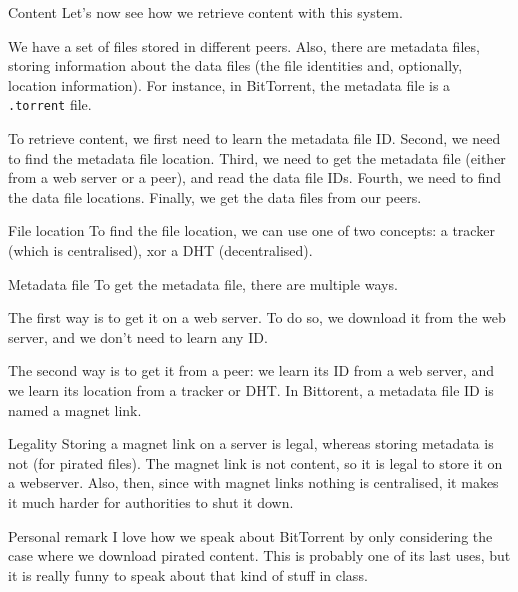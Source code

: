 \documentclass[a4paper]{article}
\begin{document}
\begin{parag}{Content}
    Let's now see how we retrieve content with this system.

    We have a set of files stored in different peers. Also, there are metadata files, storing information about the data files (the file identities and, optionally, location information). For instance, in BitTorrent, the metadata file is a \texttt{.torrent} file.

    To retrieve content, we first need to learn the metadata file ID. Second, we need to find the metadata file location. Third, we need to get the metadata file (either from a web server or a peer), and read the data file IDs. Fourth, we need to find the data file locations. Finally, we get the data files from our peers.
\end{parag}

\begin{parag}{File location}
    To find the file location, we can use one of two concepts: a tracker (which is centralised), xor a DHT (decentralised).
\end{parag}

\begin{parag}{Metadata file}
    To get the metadata file, there are multiple ways.

    The first way is to get it on a web server. To do so, we download it from the web server, and we don't need to learn any ID.

    The second way is to get it from a peer: we learn its ID from a web server, and we learn its location from a tracker or DHT. In Bittorent, a metadata file ID is named a magnet link.

    \begin{subparag}{Legality}
         Storing a magnet link on a server is legal, whereas storing metadata is not (for pirated files). The magnet link is not content, so it is legal to store it on a webserver. Also, then, since with magnet links nothing is centralised, it makes it much harder for authorities to shut it down.
    \end{subparag}
    
    \begin{subparag}{Personal remark}
        I love how we speak about BitTorrent by only considering the case where we download pirated content. This is probably one of its last uses, but it is really funny to speak about that kind of stuff in class.
    \end{subparag}
\end{parag}
\end{document}
